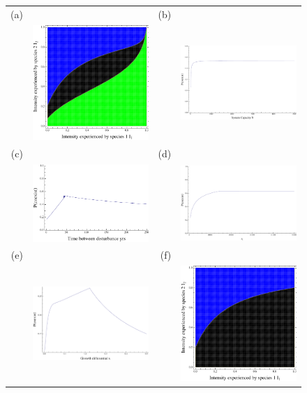 \documentclass[preprint,10pt,reqno]{amsart}
\begin{document}
\begin{figure}[htbp]
\centering
\begin{tabular}{rrrr}
(a)&&(b)&\\
&\includegraphics[width=2in]{fullexample}&&\includegraphics[width=2in]{fullintwithN} \\
(c)&&(d)&\\
&\includegraphics[width=2in]{fullintwTd}&&\includegraphics[width=2in]{fullintwiths1} \\
(e)&&(f)&\\
&\includegraphics[width=2in]{fulltointwx}&&\includegraphics[width=2in]{fulllarges1}

\end{tabular}
\end{figure}
\end{document}
